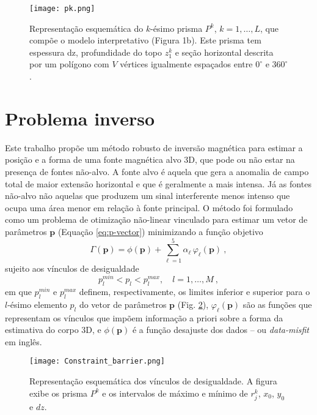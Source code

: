\begin{figure}[!htb]
	\centering
	\texttt{[image: pk.png]}
	\caption{Representação esquemática do $k$-ésimo prisma $P^k$, $k=1,\dots, L$, que compõe o modelo interpretativo (Figura 1b). Este prisma tem espessura dz, profundidade do topo $z_1^k$ e seção horizontal descrita por um polígono com $V$ vértices igualmente espaçados entre $0^{\circ}$ e $360^{\circ}$.
}
	\label{fig:pk}
\end{figure}
\pagebreak

\section{Problema inverso}

Este trabalho propõe um método robusto de inversão magnética para estimar a posição e a forma de uma fonte magnética alvo 3D, que pode ou não estar na presença de fontes não-alvo.
A fonte alvo é aquela que gera a anomalia de campo total de maior extensão horizontal e que é geralmente a mais intensa.
Já as fontes não-alvo não aquelas que produzem um sinal interferente menos intenso que ocupa uma área menor em relação à fonte principal.
O método foi formulado como um problema de otimização não-linear vinculado para estimar um vetor de parâmetros $\mathbf{p}$ (Equação \ref{eq:p-vector}) minimizando a função objetivo
\begin{equation}
\Gamma (\mathbf{p}) = \phi (\mathbf{p}) + \sum\limits^{5}_{\ell =1} \alpha_{\ell} \, \varphi_{\ell}(\mathbf{p}) \: ,
\label{eq:gamma}
\end{equation}
sujeito aos vínculos de desigualdade
\begin{equation}
p_{l}^{min} < p_{l} < p_{l}^{max}, \quad l = 1, \dots, M \: ,
\label{eq:inequality-constraints}
\end{equation}
em que $p_{l}^{min}$ e $p_{l}^{max}$ definem, respectivamente, os limites inferior e superior para o $l$-ésimo elemento $p_{l}$ do vetor de parâmetros $\mathbf{p}$ (Fig. \ref{fig:barreira}),
$\varphi_{\ell}(\mathbf{p})$ são as funções que representam os vínculos que impõem informação a priori sobre a forma da estimativa do corpo 3D, e $\phi (\mathbf{p})$ 
é a função desajuste dos dados -- ou \textit{data-misfit} em inglês.

\begin{figure}[!htb]
	\centering
	\texttt{[image: Constraint\_barrier.png]}
	\caption{Representação esquemática dos vínculos de desigualdade. A figura exibe os prisma $P^k$ e os intervalos de máximo e mínimo de $r^k_j$, $x_0$, $y_0$ e $ dz $.}
	\label{fig:barreira}
\end{figure}


